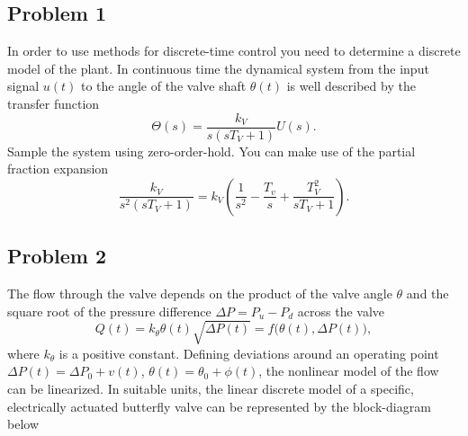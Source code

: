 \documentclass[letterpaper,12pt]{scrartcl}
\newcommand{\bmpl}{\begin{minipage}[t]{\textwidth}}
\newcommand{\emp}{\end{minipage}}
\begin{document}
\subsection*{Problem 1}

In order to use methods for discrete-time control you need to determine a discrete model of the plant. In continuous time the dynamical system from the input signal $u(t)$ to the angle of the valve shaft $\theta(t)$ is well described by the transfer function
\[ \Theta (s) = \frac{k_V}{s(sT_V + 1)} U(s). \]
Sample the system using zero-order-hold. You can make use of the partial fraction expansion
\[ \frac{k_V}{s^2(sT_V+1)} = k_V \left( \frac{1}{s^2} - \frac{T_v}{s} + \frac{T_V^2}{sT_V + 1} \right).\]

\noindent
\fbox{
\bmpl
{\bf Calculations:}\\
\vspace*{15cm}
\emp}

\subsection*{Problem 2}

  The flow through the valve depends on the product of the valve angle $\theta$ and the square root of the pressure difference $\Delta P = P_u - P_d$ across the valve
  \[ Q(t) = k_\theta \theta(t) \sqrt{\Delta P(t)} = f\big(\theta(t), \Delta P(t)\big),\]
 where  $k_\theta$ is a positive constant. Defining deviations around an operating point $\Delta P(t) = \Delta P_0 + v(t)$, $\theta(t) = \theta_0 + \phi(t)$, the nonlinear model of the flow can be linearized. In suitable units, the linear discrete model of a specific, electrically actuated butterfly valve can be represented by the block-diagram below
\begin{center}
   \end{center}
\end{document}
